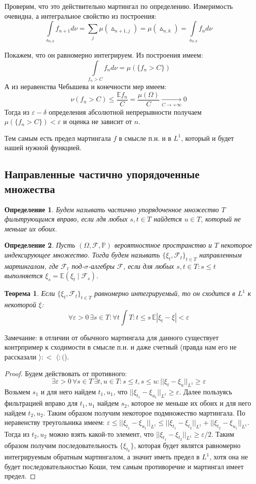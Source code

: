\documentclass[12pt,a4paper]{article} %
\newtheorem{theorem}{Теорема}
\newtheorem{definition}{Определение}
\newcommand{\E}{\mathbb{E}}
\newcommand{\PR}{\mathbb{P}}
\newcommand{\F}{\mathcal{F}}
\begin{document}
	Проверим, что это действительно мартингал по определению. Измеримость очевидна, а интегральное свойство из построения:
	$$\int\limits_{\vartriangle_{n,k}}f_{n+1}d\nu=\sum_j\mu(\vartriangle_{n+1,j})=\mu(\vartriangle_{n,k})=\int\limits_{\vartriangle_{n,k}}f_nd\nu$$
	
	Покажем, что он равномерно интегрируем. Из построения имеем:
	$$\int\limits_{f_n>C}f_nd\nu=\mu(\{f_n>C\})$$
	А из неравенства Чебышева и конечности мер имеем:
	$$\nu(f_n>C)\leq\frac{\E f_n}{C}=\frac{\mu(\Omega)}{C}\xrightarrow[C\rightarrow+\infty]{}0$$
	Тогда из $\varepsilon-\delta$ определения абсолютной непрерывности получаем $\mu(\{f_n>C\})<\varepsilon$ и оценка не зависит от $n$.
	
	Тем самым есть предел мартингала $f$ в смысле п.н. и в $L^1$, который и будет нашей нужной функцией.
	\subsection{Направленные частично упорядоченные множества}
	\begin{definition}
		Будем называть частично упорядоченное множество $T$ фильтрующимся вправо, если лдя любых $s,t\in T$ найдется $u\in T$, который не меньше их обоих.
	\end{definition}
	\begin{definition}
		Пусть $(\Omega,\F,\PR)$ вероятностное пространство и $T$ некоторое индексирующее множество. Тогда будем называть $\{\xi_t,\F_t\}_{t\in T}$ направленным мартингалом, где $\F_t$ под-$\sigma$-алгебры $\F$, если для любых $s,t\in T:s\leq t$ выполняется $\xi_s=\E(\xi_t\mid\F_s)$.
	\end{definition}
	\begin{theorem}
		Если $\{\xi_t,\F_t\}_{t\in T}$ равномерно интегрируемый, то он сходится в $L^1$ к некоторой $\xi$:
		$$\forall\varepsilon>0\,\exists s\in T:\forall t\int T: t\leq s\,\E|\xi_t-\xi|<\varepsilon$$
	\end{theorem}
	Замечание: в отличии от обычного мартингала для данного существует контрпример к сходимости в смысле п.н. и даже счетный (правда нам его не рассказали $\rangle:<\,\, \langle:($).
	\begin{proof}
		Будем действовать от противного:
		$$\exists\varepsilon>0\,\forall s\in T\,\exists t,u\in T: s\leq t,s\leq u:||\xi_t-\xi_u||_{L^1}\geq\varepsilon$$
		Возьмем $s_1$ и для него найдем $t_1,u_1$, что $||\xi_{t_1}-\xi_{u_1}||_{L^1}\geq\varepsilon$. Далее пользуясь фильтрацией вправо для $t_1,u_1$ найдем $s_2$, которое не меньше их обоих и для него найдем $t_2,u_2$. Таким образом получим некоторое подмножество мартингала. По неравенству треугольника имеем: $\varepsilon\leq||\xi_{t_1}-\xi_{u_1}||_{L^1}\leq||\xi_{t_1}-\xi_{t_2}||_{L^1}+||\xi_{t_2}-\xi_{u_1}||_{L^1}$. Тогда из $t_2,u_2$ можно взять какой-то элемент, что $||\xi_{t_1}-\xi_{t_2}||_{L^1}\geq\varepsilon/2$. Таким образом получим последовательность $\{\xi_{t_k}\}$, которая будет являтся равномерно интегрируемым обратным мартингалом, а значит иметь предел в $L^1$, хотя она не будет последовательностью Коши, тем самым противоречие и мартингал имеет предел.
	\end{proof}
\end{document}
